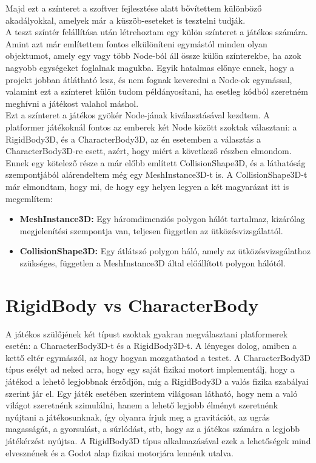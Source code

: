 Majd ezt a színteret a szoftver fejlesztése alatt bővítettem különböző akadályokkal, amelyek már a küszöb-eseteket is tesztelni tudják.\\

A teszt színtér felállítása után létrehoztam egy külön színteret a játékos számára. Amint azt már említettem fontos elkülöníteni egymástól minden olyan objektumot, amely egy vagy több Node-ból áll össze külön színterekbe, ha azok nagyobb egységeket foglalnak magukba. Egyik hatalmas előnye ennek, hogy a projekt jobban átlátható lesz, és nem fognak keveredni a Node-ok egymással, valamint ezt a színteret külön tudom példányosítani, ha esetleg kódból szeretném meghívni a játékost valahol máshol.\\

Ezt a színteret a játékos gyökér Node-jának kiválasztásával kezdtem. A platformer játékoknál fontos az emberek két Node között szoktak választani: a RigidBody3D, és a CharacterBody3D, az én esetemben a választás a\\ CharacterBody3D-re esett, azért, hogy miért a következő részben elmondom. Ennek egy kötelező része a már előbb említett CollisionShape3D, és a láthatóság szempontjából alárendeltem még egy MeshInstance3D-t is. A CollisionShape3D-t már elmondtam, hogy mi, de hogy egy helyen legyen a két magyarázat itt is megemlítem:

\begin{itemize}
	\item \textbf{MeshInstance3D:} Egy háromdimenziós polygon hálót tartalmaz, kizáró\-lag megjelenítési szempontja van, teljesen független az ütközésvizsgálattól.
	\item \textbf{CollisionShape3D:} Egy átlátszó polygon háló, amely az ütközésvizsgá\-lathoz szükséges, független a MeshInstance3D által előállított polygon hálótól.
\end{itemize}

\section[Rigid vs Character]{RigidBody vs CharacterBody}

A játékos szülőjének két típust szoktak gyakran megválasztani platformerek esetén: a CharacterBo\-dy3D-t és a RigidBody3D-t. A lényeges dolog, amiben a kettő eltér egymászól, az hogy hogyan mozgathatod a testet. A CharacterBody3D típus esélyt ad neked arra, hogy egy saját fizikai motort implementálj, hogy a játékod a lehető legjobbnak érződjön, míg a RigidBody3D a valós fizika szabályai szerint jár el. Egy játék esetében szerintem világosan látható, hogy nem a való világot szeretnénk szimulálni, hanem a lehető legjobb élményt szeretnénk nyújtani a játékosunknak, így olyanra írjuk meg a gravitációt, az ugrás magasságát, a gyorsulást, a súrlódást, stb, hogy az a játékos számára a legjobb játékérzést nyújtsa. A RigidBody3D típus alkalmazásával ezek a lehetőségek mind elvesznének és a Godot alap fizikai motorjára lennénk utalva.\\

